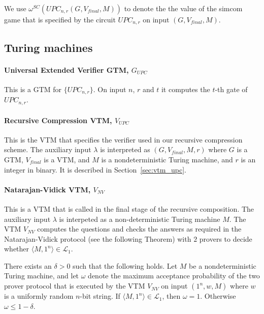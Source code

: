 We use $\omega^{SC}(UPC_{n,r}(G,V_{final},M))$ to denote the the value of the simcom game that is specified by the circuit $UPC_{n,r}$ on input $(G,V_{final},M)$.

\subsection{Turing machines}

\paragraph{Universal Extended Verifier GTM, $G_{UPC}$} This is a GTM for $\{UPC_{n,r}\}$. On input $n$, $r$ and $t$ it computes the $t$-th gate of $UPC_{n,r}$. 

\paragraph{Recursive Compression VTM, $V_{UPC}$} This is the VTM that specifies the verifier used in our recursive compression scheme. The auxiliary input $\lambda$ is interpreted as $(G,V_{final},M,r)$ where $G$ is a GTM, $V_{final}$ is a VTM, and $M$ is a nondeterministic Turing machine, and $r$ is an integer in binary. It is described in Section~\ref{sec:vtm_upc}. 

\paragraph{Natarajan-Vidick VTM, $V_{NV}$} This is a VTM that is called in the final stage of the recursive composition. The auxiliary input $\lambda$ is interpeted as a non-deterministic Turing machine $M$. The VTM $V_{NV}$ computes the questions and checks the answers as required in the Natarajan-Vidick protocol (see the following Theorem) with $2$ provers to decide whether $\langle M, 1^n \rangle \in \mathcal{L}_1$.

\begin{theorem}\label{thm:nv}
There exists an $\delta > 0$ such that the following holds. Let $M$ be a nondeterministic Turing machine, and let $\omega$ denote the maximum acceptance probability of the two prover protocol that is executed by the VTM $V_{NV}$ on input $(1^n,w,M)$ where $w$ is a uniformly random $n$-bit string. If $\langle M, 1^n \rangle \in \mathcal{L}_1$, then $\omega = 1$. Otherwise $\omega \leq 1 - \delta$. 
\end{theorem}


